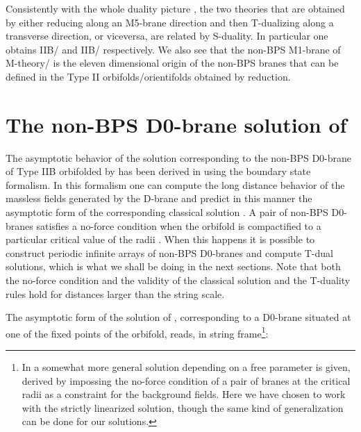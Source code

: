 \documentclass[12pt,a4paper]{article}
\begin{document}
\noindent Consistently with the whole duality picture \cite{HW}, 
the two theories that are obtained by either reducing along an
M5-brane direction and then T-dualizing along a transverse direction,
or viceversa, are related by S-duality. In particular one obtains
IIB/\coordHE{} and IIB/\coordHE{} respectively.
We also see that the non-BPS M1-brane of M-theory/\coordHE{}
is the eleven dimensional origin of the non-BPS branes that can be
defined in the
Type II orbifolds/orientifolds obtained by reduction.

 
\section{The non-BPS D0-brane solution of \cite{EP}}

The asymptotic behavior of the solution corresponding to the
non-BPS D0-brane of Type IIB orbifolded by \coordHE{}
has been derived in \cite{EP} using the boundary state formalism.
In this formalism one can compute the long distance behavior
of the massless fields generated by the D-brane and predict in
this manner the asymptotic form of the corresponding classical 
solution \cite{DFLPRS}. 
A pair of non-BPS D0-branes satisfies a no-force
condition when the orbifold is compactified to a particular 
critical value of the radii
\cite{GS,MOT}. When this happens it is possible to construct
periodic infinite arrays of non-BPS D0-branes
and compute T-dual solutions, which is what we shall be doing in the
next sections. Note that both the no-force condition and the validity
of the classical solution and the T-duality rules hold for distances
larger than the string scale.

The asymptotic form of the solution of \cite{EP}, corresponding to a
D0-brane situated at one of the fixed points of the orbifold,
reads, in string frame\footnote{In \cite{EP} a somewhat more general solution
depending on a free parameter \coordHE{} is given, derived by
impossing the no-force condition of a pair of branes at the critical radii
as a constraint for the background fields. Here we have chosen to work
with the strictly linearized solution, though the same kind of 
generalization can be done for our solutions.}:
\end{document}
